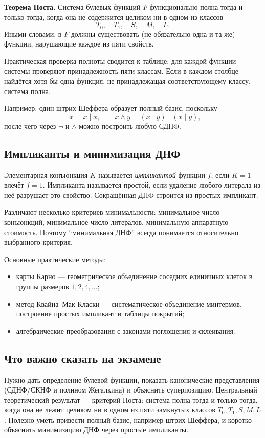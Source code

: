 \textbf{Теорема Поста.}
Система булевых функций $F$ функционально полна тогда и только тогда, когда она
не содержится целиком ни в одном из классов
\[
 T_0,\quad T_1,\quad S,\quad M,\quad L.
\]
Иными словами, в $F$ должны существовать (не обязательно одна и та же) функции,
нарушающие каждое из пяти свойств.

Практическая проверка полноты сводится к таблице: для каждой функции системы
проверяют принадлежность пяти классам. Если в каждом столбце найдётся хотя бы
одна функция, не принадлежащая соответствующему классу, система полна.

Например, один штрих Шеффера образует полный базис, поскольку
\[
 \neg x=x\mid x,
 \qquad
 x\land y=(x\mid y)\mid(x\mid y),
\]
после чего через $\neg$ и $\land$ можно построить любую СДНФ.

\subsection{Импликанты и минимизация ДНФ}

Элементарная конъюнкция $K$ называется \emph{импликантой} функции $f$, если
$K=1$ влечёт $f=1$. Импликанта называется простой, если удаление любого литерала
из неё разрушает это свойство. Сокращённая ДНФ строится из простых импликант.

Различают несколько критериев минимальности: минимальное число конъюнкций,
минимальное число литералов, минимальную аппаратную стоимость. Поэтому
``минимальная ДНФ'' всегда понимается относительно выбранного критерия.

Основные практические методы:
\begin{itemize}
 \item карты Карно --- геометрическое объединение соседних единичных клеток в
       группы размеров $1,2,4,\ldots$;
 \item метод Квайна--Мак-Класки --- систематическое объединение минтермов,
       построение простых импликант и таблицы покрытий;
 \item алгебраические преобразования с законами поглощения и склеивания.
\end{itemize}

\subsection{Что важно сказать на экзамене}

Нужно дать определение булевой функции, показать канонические представления
(СДНФ/СКНФ и полином Жегалкина) и объяснить суперпозицию. Центральный теоретический
результат --- критерий Поста: система полна тогда и только тогда, когда она не
лежит целиком ни в одном из пяти замкнутых классов $T_0,T_1,S,M,L$. Полезно
уметь привести полный базис, например штрих Шеффера, и коротко объяснить
минимизацию ДНФ через простые импликанты.

\newpage
